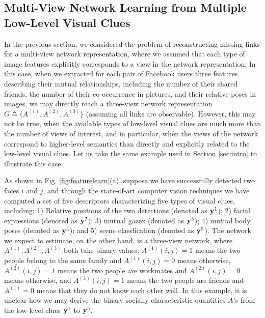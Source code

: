 \subsection{Multi-View Network Learning from Multiple Low-Level Visual Clues}
\label{sec:vis2net}

In the previous section, we considered the problem of reconstructing missing links for a multi-view network representation, where we assumed that each type of image features explicitly corresponds to a view in the network representation. In this case, when we extracted for each pair of Facebook users three features describing their mutual relationships, including the number of their shared friends, the number of their co-occurrence in pictures, and their relative poses in images, we may directly reach a three-view network representation $G\triangleq\{A^{(1)}, A^{(2)}, A^{(3)}\}$ (assuming all links are observable). However, this may not be true, when the available types of low-level visual clues are much more than the number of views of interest, and in particular, when the views of the network correspond to higher-level semantics than directly and explicitly related to the low-level visual clues. Let us take the same example used in Section \ref{sec:intro} to illustrate this case.

As shown in Fig. \ref{fig:featurelearn}(a), suppose we have successfully detected two faces $i$ and $j$, and through the state-of-art computer vision techniques we have computed a set of five descriptors characterizing five types of visual clues, including: 1) Relative positions of the two detections (denoted as ${\bf y}^1$); 2) facial expressions (denoted as ${\bf y}^2$); 3) mutual gazex (denoted as ${\bf y}^3$); 4) mutual body poses (denoted as ${\bf y}^4$); and 5) scene classfication (denoted as ${\bf y}^5$). The network we expect to estimate, on the other hand, is a three-view network, where $A^{(1)}, A^{(2)}, A^{(3)}$ both take binary values. $A^{(1)}(i,j)=1$ means the two people belong to the same family and $A^{(1)}(i,j)=0$ means otherwise, $A^{(2)}(i,j)=1$ means the two people are workmates and $A^{(2)}(i,j)=0$ means otherwise, and $A^{(3)}(i,j)=1$ means the two people are friends and $A^{(1)}=0$ means that they do not know each other well. In this example, it is unclear how we may derive the binary socially-characteristic quantities $A$'s from the low-level clues ${\bf y}^1$ to ${\bf y}^5$.



